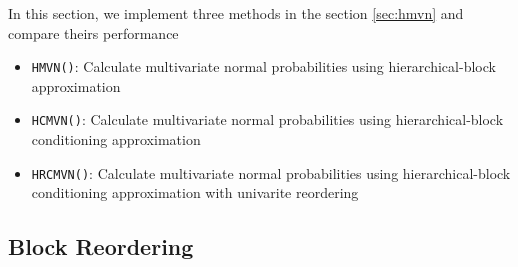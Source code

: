 In this section, we implement three methods in the section \ref{sec:hmvn} and compare theirs performance
\begin{itemize}
    \item \texttt{HMVN()}: Calculate multivariate normal probabilities using hierarchical-block approximation
    \item \texttt{HCMVN()}: Calculate multivariate normal probabilities using hierarchical-block conditioning approximation
    \item \texttt{HRCMVN()}: Calculate multivariate normal probabilities using hierarchical-block conditioning approximation with univarite reordering
\end{itemize}

\subsection{Block Reordering}
